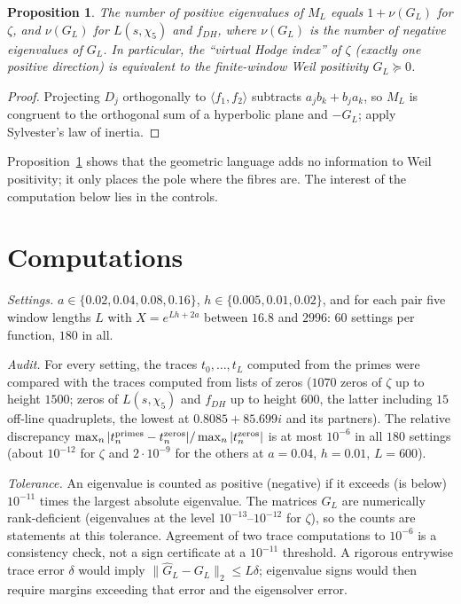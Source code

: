 \documentclass[11pt]{amsart}
\newtheorem{proposition}{Proposition}[section]
\theoremstyle{remark}
\theoremstyle{definition}
\begin{document}
\begin{proposition}\label{prop:zeta}
The number of positive eigenvalues of $M_L$ equals $1+\nu(G_L)$ for $\zeta$, and $\nu(G_L)$ for $L(s,\chi_5)$ and $f_{DH}$, where $\nu(G_L)$ is the number of negative eigenvalues of $G_L$. In particular, the ``virtual Hodge index'' of $\zeta$ (exactly one positive direction) is equivalent to the finite-window Weil positivity $G_L\succeq0$.
\end{proposition}
\begin{proof}
Projecting $D_j$ orthogonally to $\langle f_1,f_2\rangle$ subtracts $a_jb_k+b_ja_k$, so $M_L$ is congruent to the orthogonal sum of a hyperbolic plane and $-G_L$; apply Sylvester's law of inertia.
\end{proof}

Proposition~\ref{prop:zeta} shows that the geometric language adds no information to Weil positivity; it only places the pole where the fibres are. The interest of the computation below lies in the controls.

\section{Computations}\label{sec:num}

\emph{Settings.} $a\in\{0.02,0.04,0.08,0.16\}$, $h\in\{0.005,0.01,0.02\}$, and for each pair five window lengths $L$ with $X=e^{Lh+2a}$ between $16.8$ and $2996$: $60$ settings per function, $180$ in all.

\emph{Audit.} For every setting, the traces $t_0,\dots,t_L$ computed from the primes were compared with the traces computed from lists of zeros ($1070$ zeros of $\zeta$ up to height $1500$; zeros of $L(s,\chi_5)$ and $f_{DH}$ up to height $600$, the latter including $15$ off-line quadruplets, the lowest at $0.8085+85.699i$ and its partners). The relative discrepancy $\max_n|t_n^{\rm primes}-t_n^{\rm zeros}|/\max_n|t_n^{\rm zeros}|$ is at most $10^{-6}$ in all $180$ settings (about $10^{-12}$ for $\zeta$ and $2\cdot10^{-9}$ for the others at $a=0.04$, $h=0.01$, $L=600$).

\emph{Tolerance.} An eigenvalue is counted as positive (negative) if it exceeds (is below) $10^{-11}$ times the largest absolute eigenvalue. The matrices $G_L$ are numerically rank-deficient (eigenvalues at the level $10^{-13}$--$10^{-12}$ for $\zeta$), so the counts are statements at this tolerance. Agreement of two trace computations to $10^{-6}$ is a consistency check, not a sign certificate at a $10^{-11}$ threshold. A rigorous entrywise trace error $\delta$ would imply $\|\widehat G_L-G_L\|_2\le L\delta$; eigenvalue signs would then require margins exceeding that error and the eigensolver error.
\end{document}
